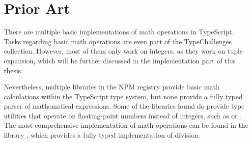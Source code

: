 \section{Prior Art}

There are multiple basic implementations of math operations in TypeScript. Tasks regarding basic math operations are even part of the TypeChallenges collection\cite{TypechallengesTypechallenges2023}. However, most of them only work on integers, as they work on tuple expansion, which will be further discussed in the implementation part of this thesis.

Nevertheless, multiple libraries in the NPM registry provide basic math calculations within the TypeScript type system, but none provide a fully typed parser of mathematical expressions. Some of the libraries found do provide type utilities that operate on floating-point numbers instead of integers, such as  \cite{sorhusSindresorhusTypefest2023} or \cite{kawayilinlinKawayiLinLinTypescriptlodash2023}. The most comprehensive implementation of math operations can be found in the  library \cite{arielTypeLevelArithmetic2023}, which provides a fully typed implementation of division.

